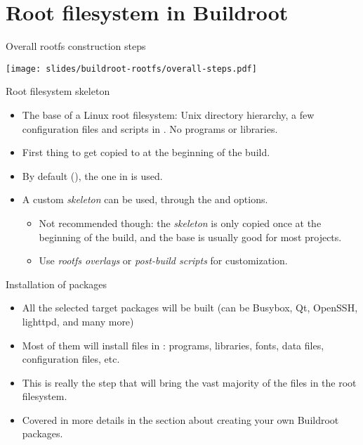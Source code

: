 
\section{Root filesystem in Buildroot}

\begin{frame}{Overall rootfs construction steps}
  \begin{center}
    \texttt{[image: slides/buildroot-rootfs/overall-steps.pdf]}
  \end{center}
\end{frame}

\begin{frame}{Root filesystem skeleton}
  \begin{itemize}
  \item The base of a Linux root filesystem: Unix directory hierarchy,
    a few configuration files and scripts in . No programs
    or libraries.
  \item First thing to get copied to  at the
    beginning of the build.
  \item By default (), the one in
     is used.
  \item A custom {\em skeleton} can be used, through the
     and
     options.
    \begin{itemize}
    \item Not recommended though: the {\em skeleton} is only copied
      once at the beginning of the build, and the base is usually good
      for most projects.
    \item Use {\em rootfs overlays} or {\em post-build scripts} for
      customization.
    \end{itemize}
  \end{itemize}
\end{frame}

\begin{frame}{Installation of packages}
  \begin{itemize}
  \item All the selected target packages will be built (can be
    Busybox, Qt, OpenSSH, lighttpd, and many more)
  \item Most of them will install files in :
    programs, libraries, fonts, data files, configuration files, etc.
  \item This is really the step that will bring the vast majority of
    the files in the root filesystem.
  \item Covered in more details in the section about creating your own
    Buildroot packages.
  \end{itemize}
\end{frame}

